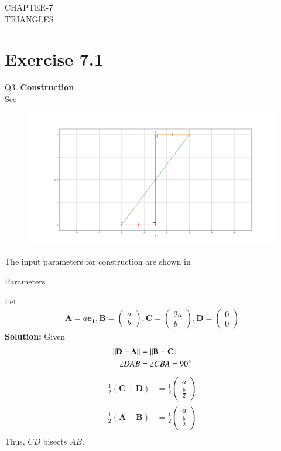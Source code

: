 \documentclass{article}
\providecommand{\norm}[1]{\left\lVert#1\right\rVert}
\newcommand{\solution}{\noindent \textbf{Solution: }}
\newcommand{\myvec}[1]{\ensuremath{\begin{pmatrix}#1\end{pmatrix}}}
\let\vec\mathbf
\begin{document}
\begin{center}
        \textbf\large{CHAPTER-7 \\ TRIANGLES}
\end{center}
\section{Exercise 7.1}
Q3. 
\textbf{Construction}\\
\fi
See 
\begin{figure}[h]
	\begin{center}
		\includegraphics[width=\columnwidth]{chapters/9/7/1/3/figs/Figure1.png}
	\end{center}
	\caption{}
	\label{fig:chapters/9/7/1/3/Fig1}
\end{figure}
The input parameters for construction are shown in 
\begin{table}[h]
	  \centering
	  
	  \caption{Parameters}
	  \label{tab:chapters/9/7/1/3/Table1}
\end{table}
Let
\begin{align}
	\vec{A} = a\vec{e_1},\vec{B} = \myvec{a\\b},\vec{C} = \myvec{2a\\b},\vec{D} = \myvec{0\\0}
\end{align}
\solution
Given
\begin{align}
	\norm{\vec{D}-\vec{A}}&=\norm{\vec{B}-\vec{C}}
	\\
	\angle DAB &= \angle CBA=90\degree
\end{align}
\begin{align}
	\frac{1}{2}(\vec{C}+\vec{D}) &= \frac{1}{2}\myvec{a \\ \frac{b}{2}}
	\\
	\frac{1}{2}(\vec{A}+\vec{B}) &= \frac{1}{2}\myvec{a \\ \frac{b}{2}}
		 \label{eq:chapters/9/7/1/3/1}\\
\end{align}
Thus, $CD$ bisects $AB$.
\end{document}
